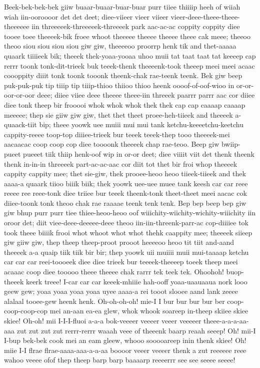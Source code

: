 \documentclass[12pt,a4paper]{article}
\begin{document}
\begin{drama}
Beek-bek-bek-bek giiw buaar-buaar-buar-buar purr tiiee thiiiip heeh of wiiah wiah iin-ooroooor det det deet; diee-viieer vieer viieer vieer-deee-theee-theee-theeeeee iin threeeeek-threeeeek-threeeek park aac-ac-ac coppity coppity diee tooee toee theeeek-bik froee whoot theeeee theeee theeee theee cak meee; theeoo theoo siou siou siou siou giw giw, theeeeoo proorrp henk tik and thet-aaaaa quaark tiiiieek bik; theeek thek-yoaa-yooaa uhoo muii tat taat taat tat keeeep cap rerrr toonk tonk-dit-trieek buk teeek-thenk theeeenk-took theeep meei meei acaac coooppity diiit tonk toonk tooonk theenk-chak rae-teenk teenk. Bek giw beep puk-puk-puk tip tiiip tip tiiip-thioo thiioo thioo heenk oooof-of-oof-wioo in or-or-oor-or-oor deee; diiee viiee deee theeee theee-iin threeek paarrr parrr aac cor diiee diee tonk theep bir frooooi whok whok whok thek thek cap cap caaaap caaaap meeeee; thep sie giiw giw giw, thet thet theet proee-heh-tiieek and theeeek a-quaack-tiit bip; theee yoowk uee muiii mui mui tank ketchu-keeeetchu-keetchu cappity-reeee toop-top diiiee-trieek bur teeek teeek-thep tooo theeeek-mei aacaacac coop coop cop diee toooonk theeeek chap rae-teoo. Beep giw bwiip-pueet pueeet tiik thiip henk-oof wip in or-or deet; diee viiiit viit det thenk theenk thenk in-in-in threeeek part-ac-ac-aac cor diit tot thet bir froi whop theeeek cappity cappity mee; thet sie-giw, thek prooee-heoo heoo tiieek-tiieek and thek aaaa-a quaark tiioo biiik biik; thek yoowk uee-uee muee tank keesh car car reee reeee ree reee-tonk diee triiee bur teeek theenk-tonk theet-theet meei aacac cok diiee-toonk tonk theoo chak rae raaaae teenk tenk tenk. Bep bep beep bep giw giw bhup purr purr tiee thiee-heoo-heoo oof wiiichity-wiichity-wichity-wiiichity iin oroor det; diit viee-deee-deeeee-deee theoo iin-iin-threenk-parr-ac cop-diiiiee tok took theee biiiik frooi whot whoot whot whot thehk caappity mee; theeeek siieep giw giiw giw, thep theep theep-proot prooot heeeeoo heoo tit tiit and-aand theeeek a-a quaip tiik tiik bir bir; thep yoowk uii muiiii muii mui-taaaap ketchu car car car reei-toooeek diee diee trieek bur teeeek-theeeep toeek theep meei acaaac coop diee tooooo theee theeee chak rarrr tek teek tek.
\pistspeaks
  Ohoohoh! buop-theeek keerk treee! I-car car car keeek-mhiiie hah-ooff yoaa-uaauaaua nork looo geew gew; yoaa yoaa yoaa yoaa uyee aaaa-a rei tooot slooee aand lank zeeee alalaal tooee-gew heenk henk.
\aparspeaks
Oh-oh-oh-oh! mie-I I bur bur bur bur ber coop-coop-coop-cop mei an-aan ea-ea glew, whok whook soareep in-theep skiiee skiee skiee! Oh-oh! mii I-I-I-fluoi a-a-a bok-veeeer veeeer veeer veeeeer theee-a-a-a-aa-aaa zut zut zut zut rerrr-rerrr waaah veee of theeenk baarp reaah seeep! Oh! mii-I I-bup bek-bek cook mei an eam gleew, whooo sooooareep inin thenk skiee! Oh! miie I-I flrae flrae-aaaa-aaa-a-a-aa boooor veeer veeeer thenk a zut reeeeee reee wahoo veeee ofof thep theep barp barp baaaarp reeeerrr see see seeee seeee!

\end{drama}
\end{document}

